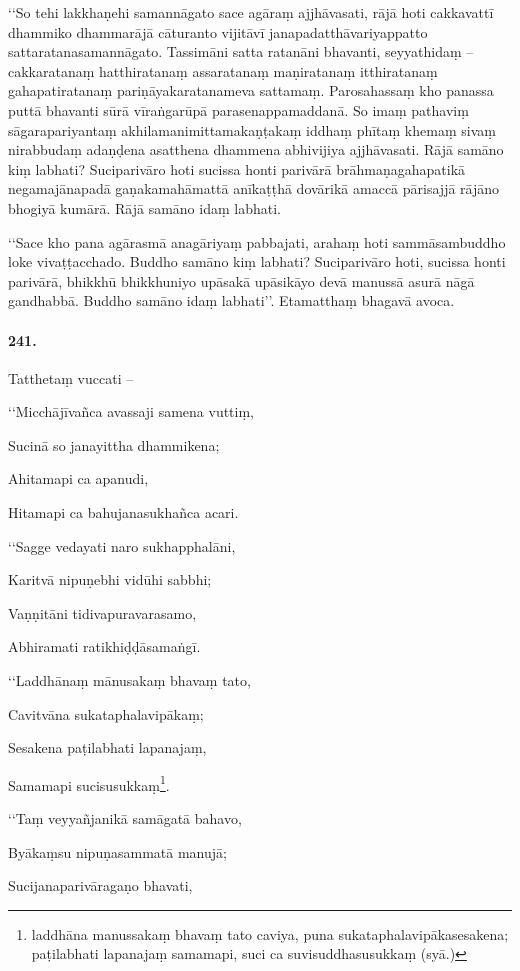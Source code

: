 ‘‘So tehi lakkhaṇehi samannāgato sace agāraṃ ajjhāvasati, rājā hoti cakkavattī dhammiko dhammarājā cāturanto vijitāvī janapadatthāvariyappatto sattaratanasamannāgato. Tassimāni satta ratanāni bhavanti, seyyathidaṃ – cakkaratanaṃ hatthiratanaṃ assaratanaṃ maṇiratanaṃ itthiratanaṃ gahapatiratanaṃ pariṇāyakaratanameva sattamaṃ. Parosahassaṃ kho panassa puttā bhavanti sūrā vīraṅgarūpā parasenappamaddanā. So imaṃ pathaviṃ sāgarapariyantaṃ akhilamanimittamakaṇṭakaṃ iddhaṃ phītaṃ khemaṃ sivaṃ nirabbudaṃ adaṇḍena asatthena dhammena abhivijiya ajjhāvasati. Rājā samāno kiṃ labhati? Suciparivāro hoti sucissa honti parivārā brāhmaṇagahapatikā negamajānapadā gaṇakamahāmattā anīkaṭṭhā dovārikā amaccā pārisajjā rājāno bhogiyā kumārā. Rājā samāno idaṃ labhati.

‘‘Sace kho pana agārasmā anagāriyaṃ pabbajati, arahaṃ hoti sammāsambuddho loke vivaṭṭacchado. Buddho samāno kiṃ labhati? Suciparivāro hoti, sucissa honti parivārā, bhikkhū bhikkhuniyo upāsakā upāsikāyo devā manussā asurā nāgā gandhabbā. Buddho samāno idaṃ labhati’’. Etamatthaṃ bhagavā avoca.

\paragraph{241.} Tatthetaṃ vuccati –

‘‘Micchājīvañca avassaji samena vuttiṃ,

Sucinā so janayittha dhammikena;

Ahitamapi ca apanudi,

Hitamapi ca bahujanasukhañca acari.

‘‘Sagge vedayati naro sukhapphalāni,

Karitvā nipuṇebhi vidūhi sabbhi;

Vaṇṇitāni tidivapuravarasamo,

Abhiramati ratikhiḍḍāsamaṅgī.

‘‘Laddhānaṃ mānusakaṃ bhavaṃ tato,

Cavitvāna sukataphalavipākaṃ;

Sesakena paṭilabhati lapanajaṃ,

Samamapi sucisusukkaṃ\footnote{laddhāna manussakaṃ bhavaṃ tato caviya, puna sukataphalavipākasesakena; paṭilabhati lapanajaṃ samamapi, suci ca suvisuddhasusukkaṃ (syā.)}.

‘‘Taṃ veyyañjanikā samāgatā bahavo,

Byākaṃsu nipuṇasammatā manujā;

Sucijanaparivāragaṇo bhavati,

